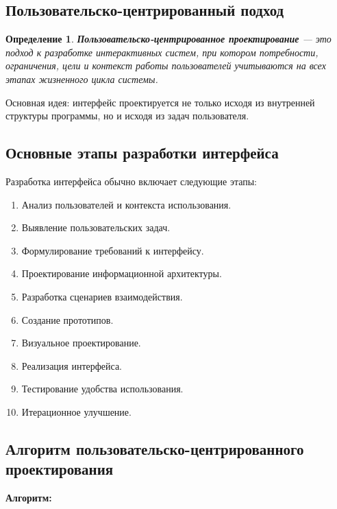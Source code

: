 \documentclass[12pt,a4paper]{article}
\newtheorem{definition}{Определение}
\begin{document}
\subsection{Пользовательско-центрированный подход}

\begin{definition}
\textbf{Пользовательско-центрированное проектирование} --- это подход к разработке интерактивных систем, при котором потребности, ограничения, цели и контекст работы пользователей учитываются на всех этапах жизненного цикла системы.
\end{definition}

Основная идея: интерфейс проектируется не только исходя из внутренней структуры программы, но и исходя из задач пользователя.

\subsection{Основные этапы разработки интерфейса}

Разработка интерфейса обычно включает следующие этапы:

\begin{enumerate}
    \item Анализ пользователей и контекста использования.
    \item Выявление пользовательских задач.
    \item Формулирование требований к интерфейсу.
    \item Проектирование информационной архитектуры.
    \item Разработка сценариев взаимодействия.
    \item Создание прототипов.
    \item Визуальное проектирование.
    \item Реализация интерфейса.
    \item Тестирование удобства использования.
    \item Итерационное улучшение.
\end{enumerate}

\subsection{Алгоритм пользовательско-центрированного проектирования}

\textbf{Алгоритм:}
\end{document}
